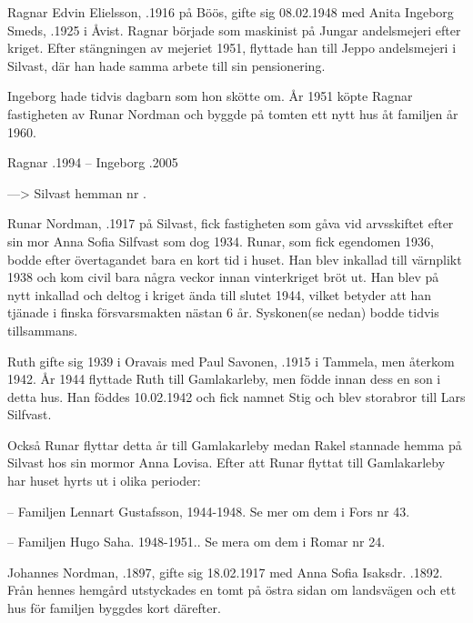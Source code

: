 Ragnar Edvin Elielsson, .1916 på Böös, gifte sig 08.02.1948 med Anita Ingeborg Smeds, .1925 i Åvist. Ragnar började som maskinist på Jungar andelsmejeri efter kriget. Efter stängningen av mejeriet 1951, flyttade han till Jeppo andelsmejeri i Silvast, där han hade samma arbete till sin pensionering.

Ingeborg hade tidvis dagbarn som hon skötte om. År 1951 köpte Ragnar fastigheten av Runar Nordman och byggde på tomten ett nytt hus åt familjen år 1960.
\begin{jhchildren}
  \item {}
  \item {}
\end{jhchildren}

Ragnar .1994  --  Ingeborg .2005


---> Silvast hemman nr .

Runar Nordman, .1917 på Silvast, fick fastigheten som gåva vid arvsskiftet efter sin mor Anna Sofia Silfvast som dog 1934. Runar, som fick egendomen 1936, bodde efter övertagandet bara en kort tid i huset. Han blev inkallad till värnplikt 1938 och kom civil bara några veckor innan vinterkriget bröt ut. Han blev på nytt inkallad och deltog i kriget ända till slutet 1944, vilket betyder att han tjänade i finska försvarsmakten nästan 6 år. Syskonen(se nedan) bodde tidvis tillsammans.



Ruth gifte sig 1939 i Oravais med  Paul Savonen, .1915 i Tammela, men återkom 1942. År 1944 flyttade Ruth till Gamlakarleby, men födde innan dess en son i detta hus. Han föddes 10.02.1942 och fick namnet Stig och blev storabror till Lars Silfvast.

Också Runar flyttar detta år till Gamlakarleby medan Rakel stannade hemma på Silvast hos sin mormor Anna Lovisa. Efter att Runar flyttat till Gamlakarleby har huset hyrts ut i olika perioder:

-- Familjen Lennart Gustafsson, 1944-1948. Se mer om dem i Fors nr 43.

-- Familjen Hugo Saha. 1948-1951.. Se mera om dem i Romar nr 24.


Johannes Nordman, .1897, gifte sig 18.02.1917 med Anna Sofia Isaksdr. .1892. Från hennes hemgård utstyckades en tomt på östra sidan om landsvägen och ett hus för familjen byggdes kort därefter.


